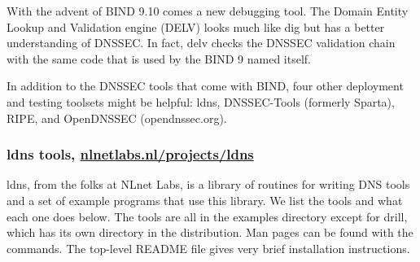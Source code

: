 With the advent of BIND 9.10 comes a new debugging tool. The Domain
Entity Lookup and Validation engine (DELV) looks much like {dig} but has
a better understanding of DNSSEC. In fact,
\protect\hypertarget{part0024_split_067.htmlux5cux23_idIndexMarker2271}{}{}\protect\hypertarget{part0024_split_067.htmlux5cux23_idIndexMarker2272}{}{}\protect\hypertarget{part0024_split_067.htmlux5cux23_idIndexMarker2273}{}{}\protect\hypertarget{part0024_split_067.htmlux5cux23_idIndexMarker2274}{}{}{delv
}checks the DNSSEC validation chain with the same code that is used by
the BIND 9 {named} itself.

In addition to the DNSSEC tools that come with BIND, four other
deployment and testing toolsets might be helpful: {ldns}, DNSSEC-Tools
(formerly Sparta), RIPE, and OpenDNSSEC (opendnssec.org).

\subsubsection[ tools,
\href{http://nlnetlabs.nl/projects/ldns}{nlnetlabs.nl/projects/ldns}]{\texorpdfstring{{\protect\hypertarget{part0024_split_067.htmlux5cux23_idTextAnchor949}{}{}ldns}
tools,
\href{http://nlnetlabs.nl/projects/ldns}{nlnetlabs.nl/projects/ldns}}{ldns tools, nlnetlabs.nl/projects/ldns}}

{ldns}, from the folks at
\protect\hypertarget{part0024_split_067.htmlux5cux23_idIndexMarker2275}{}{}NLnet
Labs, is a library of routines for writing DNS tools and a set of
example programs that use this library. We list the tools and what each
one does below. The tools are all in the {examples} directory except for
{drill}, which has its own directory in the distribution. Man pages can
be found with the commands. The top-level {README} file gives very brief
installation instructions.

